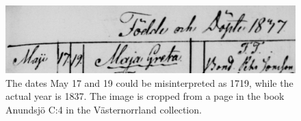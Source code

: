 
\begin{figure}
    \centering
    \includegraphics[scale=0.5]{resources/33S7-9RNM-98VF_cropped.jpg}
    \caption{The dates May 17 and 19 could be misinterpreted as 1719, while the actual year is 1837. The image is cropped from a page in the book Anundsjö C:4 in the Västernorrland collection.}
    \label{fig:example_date}
\end{figure}
